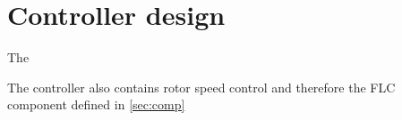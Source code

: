 \section{Controller design} \label{sec:ctrl-design}
The 


The controller also contains rotor speed control and therefore the FLC component defined in \cref{sec:comp}
